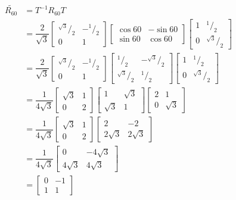 \documentclass[12pt,letter]{article}
\newcommand*\rfrac[2]{{}^{#1}\!/_{#2}}
\begin{document}
\begin{align*}
	\widetilde{R_{60}} &= T^{-1} R_{60} T \\
	&= \dfrac{2}{\sqrt{3}}
	\begin{bmatrix}
		\rfrac{\sqrt{3}}{2} & -\rfrac{1}{2} \\
		0 & 1
	\end{bmatrix}
	\begin{bmatrix}
		\cos{60} & -\sin{60} \\
		\sin{60} & \cos{60}
	\end{bmatrix}	
	\begin{bmatrix}
		1 &  \rfrac{1}{2}\\
		0 & \rfrac{\sqrt{3}}{2}
	\end{bmatrix} \\
	&= \dfrac{2}{\sqrt{3}}
	\begin{bmatrix}
		\rfrac{\sqrt{3}}{2} & -\rfrac{1}{2} \\
		0 & 1
	\end{bmatrix}
	\begin{bmatrix}
		\rfrac{1}{2} & -\rfrac{\sqrt{3}}{2} \\
		\rfrac{\sqrt{3}}{2} & \rfrac{1}{2} 
	\end{bmatrix}
	\begin{bmatrix}
		1 &  \rfrac{1}{2}\\
		0 & \rfrac{\sqrt{3}}{2}
	\end{bmatrix} \\
	&= \dfrac{1}{4\sqrt{3}}
	\begin{bmatrix}
		\sqrt{3} & 1\\
		0 & 2
	\end{bmatrix}
	\begin{bmatrix}
		1 & \sqrt{3} \\
		\sqrt{3} & 1
	\end{bmatrix}
	\begin{bmatrix}
		2 & 1 \\
		0 & \sqrt{3}
	\end{bmatrix} \\
	&= \dfrac{1}{4\sqrt{3}}
	\begin{bmatrix}
		\sqrt{3} & 1\\
		0 & 2
	\end{bmatrix}
	\begin{bmatrix}
		2 & -2 \\
		2\sqrt{3} & 2\sqrt{3}
	\end{bmatrix} \\
	&= \dfrac{1}{4\sqrt{3}}
	\begin{bmatrix}
		0 & -4\sqrt{3} \\
		4\sqrt{3} & 4\sqrt{3}
	\end{bmatrix} \\
	&=
	\begin{bmatrix}
		0 & -1 \\
		1 & 1
	\end{bmatrix}
\end{align*}
\end{document}
